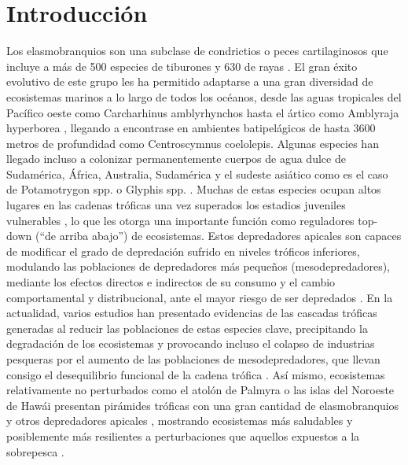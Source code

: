 \documentclass[a4paper, 11pt]{article}
\begin{document}
\tableofcontents
\listoffigures
\listoftables
\newpage

\section{Introducción}
Los elasmobranquios son una subclase de condrictios o peces cartilaginosos que incluye a más de 500 especies de tiburones y 630 de rayas \cite{Elbert2013}. El gran éxito evolutivo de este grupo les ha permitido adaptarse a una gran diversidad de ecosistemas marinos a lo largo de todos los océanos, desde las aguas tropicales del Pacífico oeste como Carcharhinus amblyrhynchos \cite{Wetherbee1997} hasta el ártico como Amblyraja hyperborea \cite{Lynghammar2012}, llegando a encontrase en ambientes batipelágicos de hasta 3600 metros de profundidad como Centroscymnus coelolepis. Algunas especies han llegado incluso a colonizar permanentemente cuerpos de agua dulce de Sudamérica, África, Australia, Sudamérica y el sudeste asiático como es el caso de Potamotrygon spp. o Glyphis spp. \cite{Martin2004}.
Muchas de estas especies ocupan altos lugares en las cadenas tróficas una vez superados los estadios juveniles vulnerables \cite{Compagno1990, Cortes1999}, lo que les otorga una importante función como reguladores top-down (“de arriba abajo”) de ecosistemas. Estos depredadores apicales son capaces de modificar el grado de depredación sufrido en niveles tróficos inferiores, modulando las poblaciones de depredadores más pequeños (mesodepredadores), mediante los efectos directos e indirectos de su consumo y el cambio comportamental y distribucional, ante el mayor riesgo de ser depredados \cite{Heithaus2004,Ritchie2009}. En la actualidad, varios estudios han presentado evidencias de las cascadas tróficas generadas al reducir las poblaciones de estas especies clave, precipitando la degradación de los ecosistemas y provocando incluso el colapso de industrias pesqueras por el aumento de las poblaciones de mesodepredadores, que llevan consigo el desequilibrio funcional de la cadena trófica \cite{Baum2003, Bascompte2005}. Así mismo, ecosistemas relativamente no perturbados como el atolón de Palmyra o las islas del Noroeste de Hawái presentan pirámides tróficas con una gran cantidad de elasmobranquios y otros depredadores apicales \cite{Friedlander2002,  Bradley2017}, mostrando ecosistemas más saludables y posiblemente más resilientes a perturbaciones que aquellos expuestos a la sobrepesca \cite{Sandin2008}. 
\end{document}
